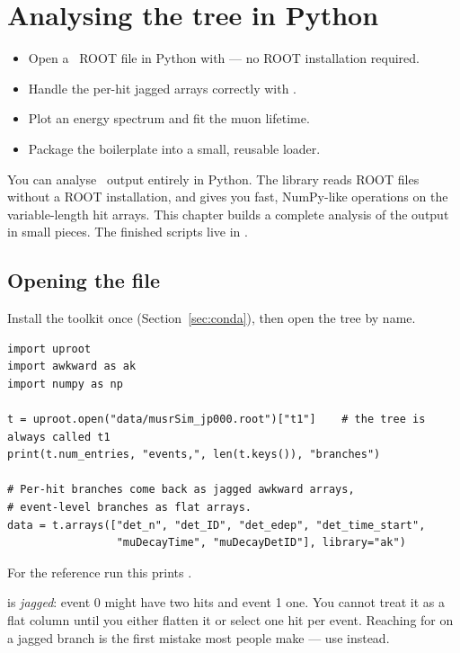 \chapter{Analysing the tree in Python}
\label{ch:python}

\begin{willdo}
\begin{itemize}
  \item Open a \musrSim\ ROOT file in Python with  --- no ROOT installation required.
  \item Handle the per-hit jagged arrays correctly with .
  \item Plot an energy spectrum and fit the muon lifetime.
  \item Package the boilerplate into a small, reusable loader.
\end{itemize}
\end{willdo}

You can analyse \musrSim\ output entirely in Python. The  library reads ROOT files without a ROOT installation, and  gives you fast, NumPy-like operations on the variable-length hit arrays. This chapter builds a complete analysis of the  output in small pieces. The finished scripts live in .

\section{Opening the file}
Install the toolkit once (Section~\ref{sec:conda}), then open the tree by name.

\begin{lstlisting}[style=py,caption={Reading tree \texttt{t1} into arrays}]
import uproot
import awkward as ak
import numpy as np

t = uproot.open("data/musrSim_jp000.root")["t1"]    # the tree is always called t1
print(t.num_entries, "events,", len(t.keys()), "branches")

# Per-hit branches come back as jagged awkward arrays,
# event-level branches as flat arrays.
data = t.arrays(["det_n", "det_ID", "det_edep", "det_time_start",
                 "muDecayTime", "muDecayDetID"], library="ak")
\end{lstlisting}

For the reference run this prints .

\begin{keypoint}
 is \emph{jagged}: event 0 might have two hits and event 1 one. You cannot treat it as a flat column until you either flatten it or select one hit per event. Reaching for  on a jagged branch is the first mistake most people make --- use  instead.
\end{keypoint}

